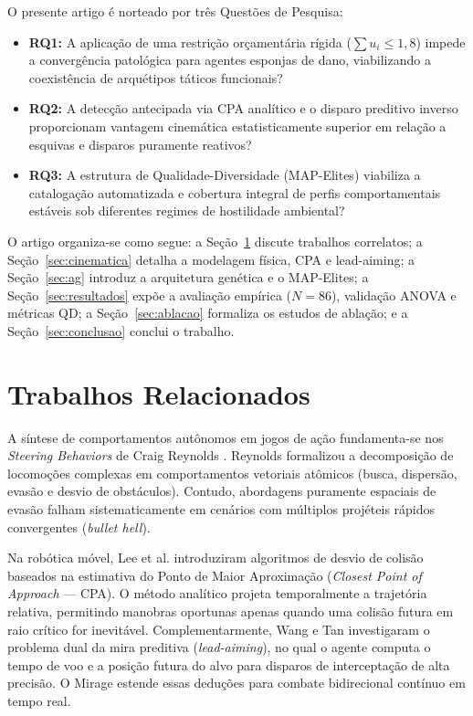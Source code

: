 \documentclass[10pt,conference,twocolumn]{article}
\begin{document}
O presente artigo é norteado por três Questões de Pesquisa:
\begin{itemize}
    \item \textbf{RQ1:} A aplicação de uma restrição orçamentária rígida ($\sum u_i \le 1{,}8$) impede a convergência patológica para agentes esponjas de dano, viabilizando a coexistência de arquétipos táticos funcionais?
    \item \textbf{RQ2:} A detecção antecipada via CPA analítico e o disparo preditivo inverso proporcionam vantagem cinemática estatisticamente superior em relação a esquivas e disparos puramente reativos?
    \item \textbf{RQ3:} A estrutura de Qualidade-Diversidade (MAP-Elites) viabiliza a catalogação automatizada e cobertura integral de perfis comportamentais estáveis sob diferentes regimes de hostilidade ambiental?
\end{itemize}

O artigo organiza-se como segue: a Seção~\ref{sec:relacionados} discute trabalhos correlatos; a Seção~\ref{sec:cinematica} detalha a modelagem física, CPA e lead-aiming; a Seção~\ref{sec:ag} introduz a arquitetura genética e o MAP-Elites; a Seção~\ref{sec:resultados} expõe a avaliação empírica ($N = 86$), validação ANOVA e métricas QD; a Seção~\ref{sec:ablacao} formaliza os estudos de ablação; e a Seção~\ref{sec:conclusao} conclui o trabalho.

\section{Trabalhos Relacionados}
\label{sec:relacionados}
A síntese de comportamentos autônomos em jogos de ação fundamenta-se nos \textit{Steering Behaviors} de Craig Reynolds \cite{reynolds1999steering}. Reynolds formalizou a decomposição de locomoções complexas em comportamentos vetoriais atômicos (busca, dispersão, evasão e desvio de obstáculos). Contudo, abordagens puramente espaciais de evasão falham sistematicamente em cenários com múltiplos projéteis rápidos convergentes (\textit{bullet hell}).

Na robótica móvel, Lee et al. \cite{lee2014collision} introduziram algoritmos de desvio de colisão baseados na estimativa do Ponto de Maior Aproximação (\textit{Closest Point of Approach} --- CPA). O método analítico projeta temporalmente a trajetória relativa, permitindo manobras oportunas apenas quando uma colisão futura em raio crítico for inevitável. Complementarmente, Wang e Tan \cite{wang2014self} investigaram o problema dual da mira preditiva (\textit{lead-aiming}), no qual o agente computa o tempo de voo e a posição futura do alvo para disparos de interceptação de alta precisão. O Mirage estende essas deduções para combate bidirecional contínuo em tempo real.
\end{document}
